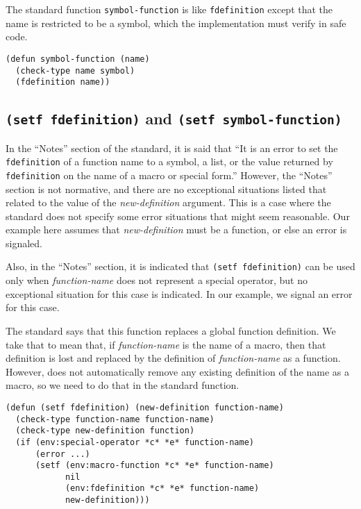 The standard function \texttt{symbol-function} is like
\texttt{fdefinition} except that the name is restricted to be a
symbol, which the implementation must verify in safe code.

\begin{verbatim}
(defun symbol-function (name)
  (check-type name symbol)
  (fdefinition name))
\end{verbatim}

\subsection{\texttt{(setf fdefinition)} and \texttt{(setf symbol-function)}}

In the ``Notes'' section of the \commonlisp{} standard, it is said
that ``It is an error to set the \texttt{fdefinition} of a function
name to a symbol, a list, or the value returned by
\texttt{fdefinition} on the name of a macro or special form.''
However, the ``Notes'' section is not normative, and there are no
exceptional situations listed that related to the value of the
\textit{new-definition} argument.  This is a case where the standard
does not specify some error situations that might seem reasonable.
Our example here assumes that \textit{new-definition} must be a
function, or else an error is signaled.

Also, in the ``Notes'' section, it is indicated that \texttt{(setf
  fdefinition)} can be used only when \textit{function-name} does not
represent a special operator, but no exceptional situation for this
case is indicated.  In our example, we signal an error for this case.

The standard says that this function replaces a global function
definition.  We take that to mean that, if \textit{function-name} is
the name of a macro, then that definition is lost and replaced by the
definition of \textit{function-name} as a function.  However,
\sysname{} does not automatically remove any existing definition of
the name as a macro, so we need to do that in the standard function.

\begin{verbatim}
(defun (setf fdefinition) (new-definition function-name)
  (check-type function-name function-name)
  (check-type new-definition function)
  (if (env:special-operator *c* *e* function-name)
      (error ...)
      (setf (env:macro-function *c* *e* function-name)
            nil
            (env:fdefinition *c* *e* function-name)
            new-definition)))
\end{verbatim}

